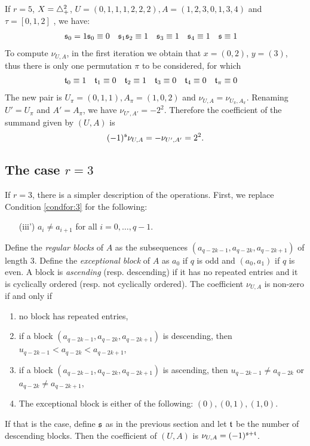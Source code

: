 \begin{example}
	If $r=5$, $X= \triangle_{+}^2$, $U = (0,1,1,1,2,2,2), A = (1,2,3,0,1,3,4)$ and $\tau = [0,1,2]$ , we have:
	\begin{align*}
	\signo_0 = 1	
  \signo_0 &\equiv 0
		&
		\signo_1 %
		&
		\signo_2 \equiv 1
		&
		\signo_3 &\equiv 1
		&
		\signo_4 &\equiv 1
		&
		\signo &\equiv 1
	\end{align*}
	To compute $\nu_{U,A}$, in the first iteration we obtain that $x=(0,2)$, $y=(3)$, thus there is only one permutation $\pi$ to be considered, for which
	\begin{align*}
		\mathfrak{t}_0 &\equiv 1
		&
		\mathfrak{t}_1 &\equiv 0
		&
		\mathfrak{t}_2 &\equiv 1
		&
		\mathfrak{t}_3 &\equiv 0
		&
		\mathfrak{t}_4 &\equiv 0
		&
		\mathfrak{t}_{\pi} &\equiv 0
	\end{align*}
	The new pair is $U_{\pi} = (0,1,1), A_\pi = (1,0,2)$ and $\nu_{U,A} = \nu_{U_\pi,A_\pi}$. Renaming $U' = U_\pi$ and $A' = A_\pi$, we have $\nu_{U',A'} = -2^2$. Therefore the coefficient of the summand given by $(U,A)$ is
	\[
		(-1)^{\mathfrak{s}} \nu_{U,A} = -\nu_{U',A'} = 2^2.
	\]
\end{example}

\subsection{The case \texorpdfstring{$r=3$}{r = 3}} If $r=3$, there is a simpler description of the operations. First, we replace Condition \eqref{condfor:3} for the following:
\begin{itemize}
	\item[(iii')] $a_i\neq a_{i+1}$ for all $i=0,\ldots,q-1$.
\end{itemize}
Define the \emph{regular blocks} of $A$ as the subsequences $(a_{q-2k-1},a_{q-2k},a_{q-2k+1})$ of length $3$. Define the \emph{exceptional block} of $A$ as $a_0$ if $q$ is odd and $(a_0,a_1)$ if $q$ is even. A block is \emph{ascending} (resp. descending) if it has no repeated entries and it is cyclically ordered (resp. not cyclically ordered). The coefficient $\nu_{U,A}$ is non-zero if and only if
\begin{enumerate}
	\item no block has repeated entries,
	\item if a block $(a_{q-2k-1},a_{q-2k},a_{q-2k+1})$ is descending, then $u_{q-2k-1}<a_{q-2k}<a_{q-2k+1}$,
	\item if a block $(a_{q-2k-1},a_{q-2k},a_{q-2k+1})$ is ascending, then $u_{q-2k-1}\neq a_{q-2k}$ or $a_{q-2k}\neq a_{q-2k+1}$,
	\item The exceptional block is either of the following: $(0),(0,1),(1,0)$.
\end{enumerate} 
If that is the case, define $\mathfrak{s}$ as in the previous section and let $\mathfrak{t}$ be the number of descending blocks. Then the coefficient of $(U,A)$ is $\nu_{U,A} = (-1)^{\mathfrak{s}+\mathfrak{t}}$.

